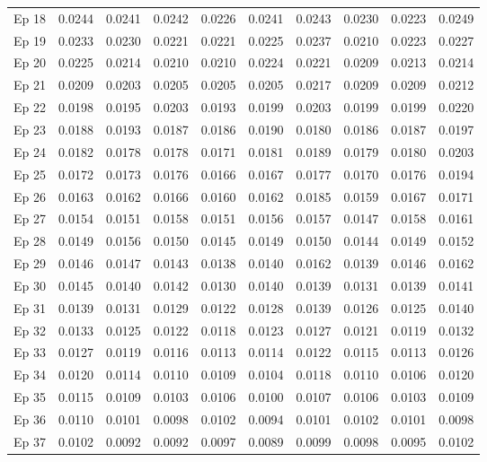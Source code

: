 \begin{table}[htbp]
\begin{tabular}{|l|l|l|l|l|l|l|l|l|l|}
Ep 18 & 0.0244 & 0.0241 & 0.0242 & 0.0226 & 0.0241 & 0.0243 & 0.0230 & 0.0223 & 0.0249  \\
Ep 19 & 0.0233 & 0.0230 & 0.0221 & 0.0221 & 0.0225 & 0.0237 & 0.0210 & 0.0223 & 0.0227  \\
Ep 20 & 0.0225 & 0.0214 & 0.0210 & 0.0210 & 0.0224 & 0.0221 & 0.0209 & 0.0213 & 0.0214  \\
Ep 21 & 0.0209 & 0.0203 & 0.0205 & 0.0205 & 0.0205 & 0.0217 & 0.0209 & 0.0209 & 0.0212  \\
Ep 22 & 0.0198 & 0.0195 & 0.0203 & 0.0193 & 0.0199 & 0.0203 & 0.0199 & 0.0199 & 0.0220  \\
Ep 23 & 0.0188 & 0.0193 & 0.0187 & 0.0186 & 0.0190 & 0.0180 & 0.0186 & 0.0187 & 0.0197  \\
Ep 24 & 0.0182 & 0.0178 & 0.0178 & 0.0171 & 0.0181 & 0.0189 & 0.0179 & 0.0180 & 0.0203  \\
Ep 25 & 0.0172 & 0.0173 & 0.0176 & 0.0166 & 0.0167 & 0.0177 & 0.0170 & 0.0176 & 0.0194  \\
Ep 26 & 0.0163 & 0.0162 & 0.0166 & 0.0160 & 0.0162 & 0.0185 & 0.0159 & 0.0167 & 0.0171  \\
Ep 27 & 0.0154 & 0.0151 & 0.0158 & 0.0151 & 0.0156 & 0.0157 & 0.0147 & 0.0158 & 0.0161  \\
Ep 28 & 0.0149 & 0.0156 & 0.0150 & 0.0145 & 0.0149 & 0.0150 & 0.0144 & 0.0149 & 0.0152  \\
Ep 29 & 0.0146 & 0.0147 & 0.0143 & 0.0138 & 0.0140 & 0.0162 & 0.0139 & 0.0146 & 0.0162  \\
Ep 30 & 0.0145 & 0.0140 & 0.0142 & 0.0130 & 0.0140 & 0.0139 & 0.0131 & 0.0139 & 0.0141  \\
Ep 31 & 0.0139 & 0.0131 & 0.0129 & 0.0122 & 0.0128 & 0.0139 & 0.0126 & 0.0125 & 0.0140  \\
Ep 32 & 0.0133 & 0.0125 & 0.0122 & 0.0118 & 0.0123 & 0.0127 & 0.0121 & 0.0119 & 0.0132  \\
Ep 33 & 0.0127 & 0.0119 & 0.0116 & 0.0113 & 0.0114 & 0.0122 & 0.0115 & 0.0113 & 0.0126  \\
Ep 34 & 0.0120 & 0.0114 & 0.0110 & 0.0109 & 0.0104 & 0.0118 & 0.0110 & 0.0106 & 0.0120  \\
Ep 35 & 0.0115 & 0.0109 & 0.0103 & 0.0106 & 0.0100 & 0.0107 & 0.0106 & 0.0103 & 0.0109  \\
Ep 36 & 0.0110 & 0.0101 & 0.0098 & 0.0102 & 0.0094 & 0.0101 & 0.0102 & 0.0101 & 0.0098  \\
Ep 37 & 0.0102 & 0.0092 & 0.0092 & 0.0097 & 0.0089 & 0.0099 & 0.0098 & 0.0095 & 0.0102  \\

\end{tabular}
\end{table}
